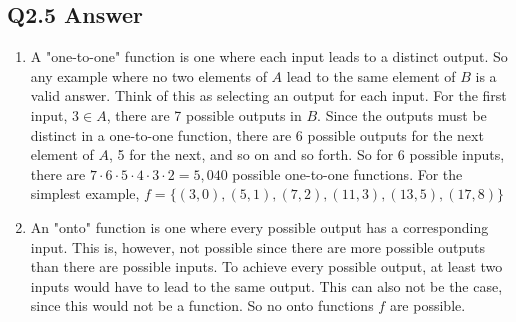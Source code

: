 \documentclass{article}
\begin{document}
\subsection*{Q2.5 Answer}
\begin{enumerate}[label=\alph*.]
\item A "one-to-one" function is one where each input leads to a distinct output. So any example where no two elements of $A$ lead to the same element of $B$ is a valid answer. Think of this as selecting an output for each input. For the first input, $3\in A$, there are 7 possible outputs in $B$. Since the outputs must be distinct in a one-to-one function, there are 6 possible outputs for the next element of $A$, 5 for the next, and so on and so forth. So for 6 possible inputs, there are $7\cdot6\cdot5\cdot 4\cdot3\cdot2=5,040$ possible one-to-one functions. For the simplest example, $f=\{(3,0),(5,1),(7,2),(11,3),(13,5),(17,8)\}$
\item An "onto" function is one where every possible output has a corresponding input. This is, however, not possible since there are more possible outputs than there are possible inputs. To achieve every possible output, at least two inputs would have to lead to the same output. This can also not be the case, since this would not be a function. So no onto functions $f$ are possible.
\end{enumerate}
\newpage
\end{document}
